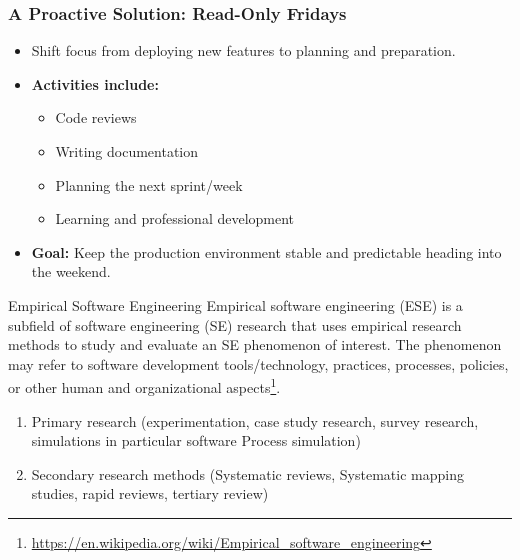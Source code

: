 \documentclass{beamer}
\begin{document}
\begin{frame}[t]
\frametitle{A Proactive Solution: Read-Only Fridays}
\begin{itemize}
    \item Shift focus from deploying new features to planning and preparation.
    \item \textbf{Activities include:}
    \begin{itemize}
        \scriptsize
        \item Code reviews
        \item Writing documentation
        \item Planning the next sprint/week
        \item Learning and professional development
    \end{itemize}
    \item \textbf{Goal:} Keep the production environment stable and predictable heading into the weekend.
\end{itemize}
\end{frame}

\begin{frame}[t]{Empirical Software Engineering}
Empirical software engineering (ESE) is a subfield of software engineering (SE) research that uses empirical research methods to study and evaluate an SE phenomenon of interest. The phenomenon may refer to software development tools/technology, practices, processes, policies, or other human and organizational aspects\footnote{\url{https://en.wikipedia.org/wiki/Empirical_software_engineering}}. %

\begin{enumerate}
    \item Primary research (experimentation, case study research, survey research, simulations in particular software Process simulation)
    \item Secondary research methods (Systematic reviews, Systematic mapping studies, rapid reviews, tertiary review)
\end{enumerate}
\end{frame}
\end{document}
